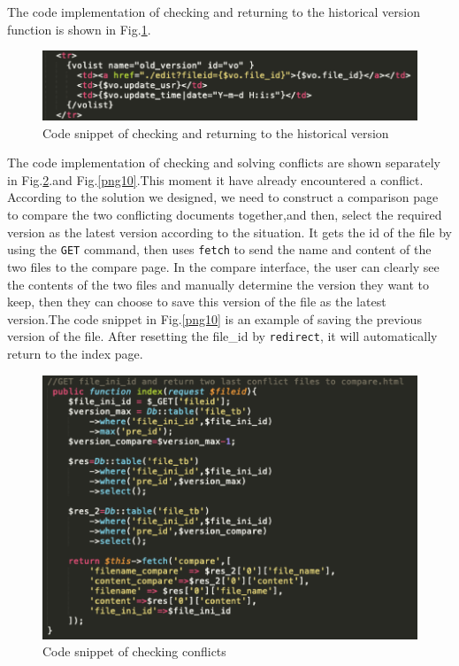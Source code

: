 \noindent The code implementation of checking and returning to the historical version function is shown in Fig.\ref{png8}.
\begin{figure}[H]
  \centering
  \includegraphics[width=.8\textwidth]{changeback.png} %
  \caption{Code snippet of checking and returning to the historical version} %
  \label{png8} %
\end{figure}


\noindent The code implementation of checking and solving conflicts are shown separately in Fig.\ref{png9}.and Fig.\ref{png10}.This moment it have already encountered a conflict. According to the solution we designed, we need to construct a comparison page to compare the two conflicting documents together,and then, select the required version as the latest version according to the situation.
\noindent It gets the id of the file by using the \texttt{GET} command, then uses \texttt{fetch} to send the name and content of the two files to the compare page.
\noindent In the compare interface, the user can clearly see the contents of the two files and manually determine the version they want to keep, then they can choose to save this version of the file as the latest version.The code snippet in Fig.\ref{png10} is an example of saving the previous version of the file. After resetting the file\_id by \texttt{redirect}, it will automatically return to the index page.
\begin{figure}[H]
  \centering
  \includegraphics[width=.8\textwidth]{conflict.png}%
  \caption{Code snippet of checking conflicts} %
  \label{png9} %
\end{figure}

